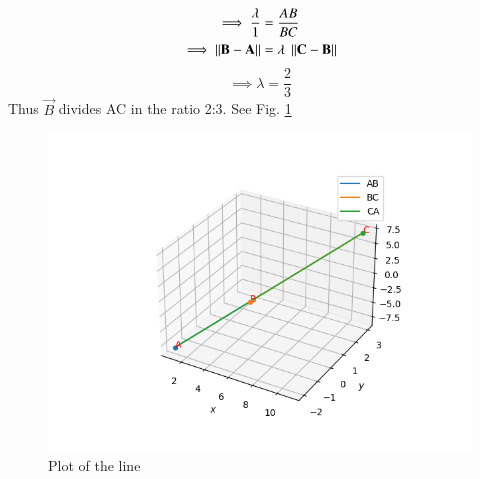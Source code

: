 \begin{align}
    \implies \dfrac{\lambda}{1} &= \dfrac{AB}{BC}\\
    \implies \left\lVert\mathbf{B} - \mathbf{A}\right\rVert &= \lambda\; \left\lVert\mathbf{C} - \mathbf{B}\right\rVert
\end{align}
\begin{equation}
    \implies \lambda = \dfrac{2}{3}
\end{equation}
%
Thus $\vec{B}$ divides AC in the ratio 2:3.  See Fig.          \ref{aug/2/13/plot}
% 
\begin{figure}[!h]
    \centering
         \includegraphics[width=\columnwidth]{solutions/aug/2/13/figures/figure.png}
         \caption{Plot of the line}
         \label{aug/2/13/plot}
\end{figure}

